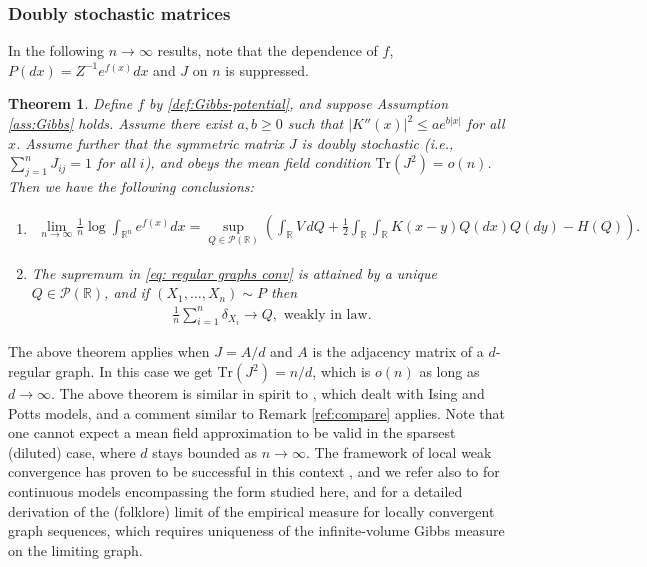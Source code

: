 \documentclass[11pt,reqno]{amsart}
\numberwithin{equation}{section}
\newtheorem{theorem}{Theorem}[section]
\theoremstyle{definition}
\def\R{{\mathbb R}}
\def\P{{\mathcal P}}
\def\tr{{\mathrm{Tr}}}
\begin{document}
\subsubsection{Doubly stochastic matrices}

In the following $n\to\infty$ results, note that the dependence of $f$, $P(dx)=Z^{-1}e^{f(x)}dx$ and $ J $ on $n$ is suppressed.

\begin{theorem} \label{thm: regular graphs}
	 Define $f$ by \eqref{def:Gibbs-potential}, and suppose Assumption \ref{ass:Gibbs} holds.
		Assume there exist $a,b \ge 0$ such that $|K''(x)|^2 \le ae^{b|x|}$ for all $x$.
	Assume further that the symmetric matrix $J$ is doubly stochastic (i.e., $\sum_{j=1}^nJ_{ij}=1$ for all $i$), and obeys the mean field condition $\tr(J^2)=o(n)$. Then we have the following conclusions: 
	\begin{enumerate}[(1)]
		\item \label{regular graphs conv}
		\begin{align}
			\lim_{n\to\infty}\frac{1}{n}\log \int_{\R^n} e^{f(x)}dx=\sup_{Q \in \P(\R)} \left( \int_{\R} V\,dQ + \frac12\int_{\R}\int_{\R} K(x-y)Q(dx)Q(dy) - H(Q)\right).\label{eq: regular graphs conv}
		\end{align}
		\item \label{regular graphs weak law}The supremum in \eqref{eq: regular graphs conv} is attained by a unique $Q \in \P(\R)$, and if $(X_1,\ldots,X_n) \sim P$ then
		\begin{align}
			\frac{1}{n}\sum_{i=1}^n\delta_{X_i} \to Q, \text{ weakly in law}. \label{eq: regular graphs weak law}
		\end{align} 
	\end{enumerate}
\end{theorem}

The above theorem applies when  $J=A/d$ and $A$ is the adjacency matrix of a $d$-regular graph. In this case we get $\tr(J^2)=n/d$, which is $o(n)$ as long as $d \to \infty$. The above theorem is similar in spirit to \cite[Theorem 2.1]{basak-mukherjee}, which dealt with Ising and Potts models, and a comment similar to Remark \ref{ref:compare} applies. Note that one cannot expect a mean field approximation to be valid in the sparsest (diluted) case, where $d$ stays bounded as $n\to\infty$. The framework of local weak convergence has proven to be successful in this context \cite{dembo2010gibbs}, and we refer also to \cite[Sections 2 and B]{lacker2019local} for continuous models encompassing the form studied here, and for a detailed derivation of the (folklore) limit of the empirical measure for locally convergent graph sequences, which requires uniqueness of the infinite-volume Gibbs measure on the limiting graph.
\end{document}
